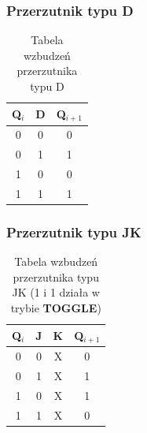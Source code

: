 \documentclass{article}
\begin{document}
\begin{minipage}[b]{0.48\textwidth} %
	\subsubsection*{Przerzutnik typu D}
	\begin{table}[H]
		\centering
		\begin{tabular}{|c|c|c|}
			\hline
			\textbf{Q$_i$} & \textbf{D} & \textbf{Q$_{i+1}$} \\ \hline
			0 & 0 & 0 \vphantom{Q$_{n-1}$} \\ %
			0 & 1 & 1 \\ 
			1 & 0 & 0 \\ 
			1 & 1 & 1 \\ 
			\hline
		\end{tabular}
		\caption{Tabela wzbudzeń przerzutnika typu D}
	\end{table}
\end{minipage}
\hfill 
\begin{minipage}[b]{0.48\textwidth} %
	\subsubsection*{Przerzutnik typu JK}
	\begin{table}[H]
		\centering
		\begin{tabular}{|c|c|c|c|}
			\hline
			\textbf{Q$_i$} & \textbf{J} & \textbf{K} & \textbf{Q$_{i+1}$} \\ \hline
			0 & 0 & X & 0 \vphantom{Q$_{n-1}$} \\ %
			0 & 1 & X & 1 \\ 
			1 & 0 & X & 1 \\ 
			1 & 1 & X & 0 \\ 
			\hline
		\end{tabular}
		\caption{Tabela wzbudzeń przerzutnika typu JK (1 i 1 działa w trybie \textbf{TOGGLE})}
	\end{table}
\end{minipage}

\vspace{2em} %

\end{document}
